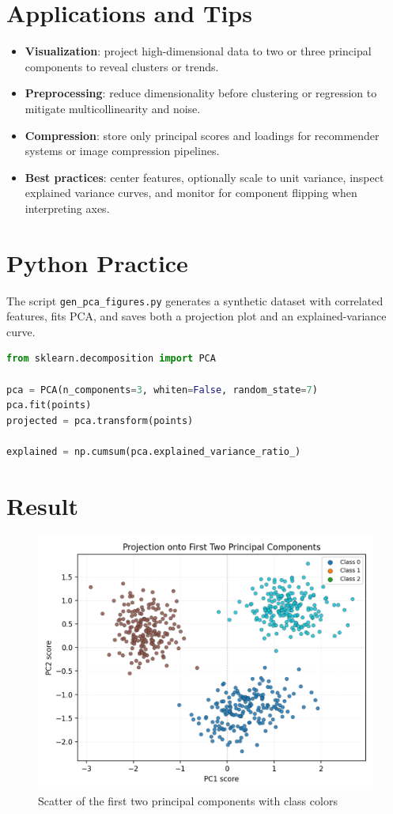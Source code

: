 ﻿\documentclass[12pt]{article}
\begin{document}
\section{Applications and Tips}
\begin{itemize}
  \item \textbf{Visualization}: project high-dimensional data to two or three principal components to reveal clusters or trends.
  \item \textbf{Preprocessing}: reduce dimensionality before clustering or regression to mitigate multicollinearity and noise.
  \item \textbf{Compression}: store only principal scores and loadings for recommender systems or image compression pipelines.
  \item \textbf{Best practices}: center features, optionally scale to unit variance, inspect explained variance curves, and monitor for component flipping when interpreting axes.
\end{itemize}

\section{Python Practice}
The script \texttt{gen\_pca\_figures.py} generates a synthetic dataset with correlated features, fits PCA, and saves both a projection plot and an explained-variance curve.
\begin{lstlisting}[language=Python,caption={Excerpt from gen_pca_figures.py}]
from sklearn.decomposition import PCA

pca = PCA(n_components=3, whiten=False, random_state=7)
pca.fit(points)
projected = pca.transform(points)

explained = np.cumsum(pca.explained_variance_ratio_)
\end{lstlisting}

\section{Result}
\begin{figure}[H]
  \centering
  \includegraphics[width=0.82\linewidth]{pca_projection.png}
  \caption{Scatter of the first two principal components with class colors}
  \label{fig:pca_projection}
\end{figure}
\end{document}
